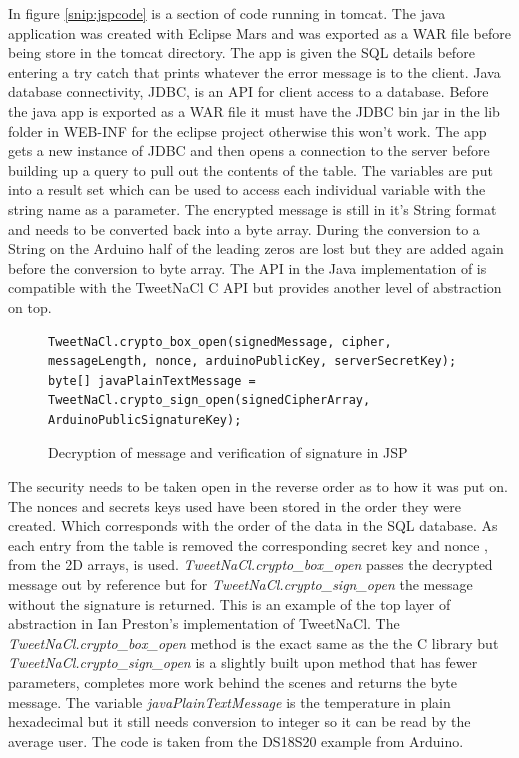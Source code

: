 In figure \ref{snip:jspcode} is a section of code running in tomcat. The java application was created with Eclipse Mars and was exported as a WAR file before being store in the tomcat directory. The app is given the SQL details before entering a try catch that prints whatever the error message is to the client. Java database connectivity, JDBC, is an API for client access to a database. Before the java app is exported as a WAR file it must have the JDBC bin jar in the lib folder in WEB-INF for the eclipse project otherwise this won't work. The app gets a new instance of JDBC and then opens a connection to the server before building up a query to pull out the contents of the table. The variables are put into a result set which can be used to access each individual variable with the string name as a parameter. The encrypted message is still in it's String format and needs to be converted back into a byte array. During the conversion to a String on the Arduino half of the leading zeros are lost but they are added again before the conversion to byte array. The API in the Java implementation of is compatible with the TweetNaCl C API but provides another level of abstraction on top. 

\begin{figure}[H]
\begin{lstlisting}[style=Java]
TweetNaCl.crypto_box_open(signedMessage, cipher, messageLength, nonce, arduinoPublicKey, serverSecretKey);
byte[] javaPlainTextMessage = TweetNaCl.crypto_sign_open(signedCipherArray, ArduinoPublicSignatureKey);
\end{lstlisting}
\caption{Decryption of message and verification of signature in JSP}
\label{snip:decryptjsp}
\end{figure}

The security needs to be taken open in the reverse order as to how it was put on. The nonces and secrets keys used have been stored in the order they were created. Which corresponds with the order of the data in the SQL database. As each entry from the table is removed the corresponding secret key and nonce , from the 2D arrays, is used. \emph{TweetNaCl.crypto\_box\_open} passes the decrypted message out by reference but for \emph{TweetNaCl.crypto\_sign\_open} the message without the signature is returned. This is an example of the top layer of abstraction in Ian Preston's implementation of TweetNaCl. The  \emph{TweetNaCl.crypto\_box\_open} method is the exact same as the the C library but \emph{TweetNaCl.crypto\_sign\_open} is a slightly built upon method that has fewer parameters, completes more work behind the scenes and returns the byte message. The variable \emph{javaPlainTextMessage} is the temperature in plain hexadecimal but it still needs conversion to integer so it can be read by the average user. The code is taken from the DS18S20 example from Arduino.

